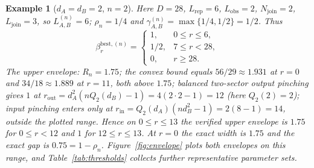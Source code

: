 \documentclass[11pt,a4paper]{article}
\newtheorem{example}[theorem]{Example}
\begin{document}
\begin{example}[$d_A=d_B=2$, $n=2$]
\label{ex:222}
Here $D=28$, $L_{\mathrm{rep}}=6$, $L_{\mathrm{obs}}=2$, $N_{\mathrm{join}}=2$, $L_{\mathrm{join}}=3$, so $L_{A,B}^{(n)}=6$; $\rho_n=1/4$ and $\gamma_{A,B}^{(n)}=\max\{1/4,1/2\}=1/2$. Thus
\[
\beta_r^{\mathrm{best},(n)}=
\begin{cases}
1,&0\le r\le6,\\
1/2,&7\le r<28,\\
0,&r\ge28.
\end{cases}
\]
The upper envelope: $R_n=1.75$; the convex bound equals $56/29\approx1.931$ at $r=0$ and $34/18\approx1.889$ at $r=11$, both above $1.75$; balanced two-sector output pinching gives $1$ at $r_{\mathrm{out}}=d_A^2(nQ_2(d_B)-1)=4(2\cdot2-1)=12$ (here $Q_2(2)=2$); input pinching enters only at $r_{\mathrm{in}}=Q_2(d_A)(nd_B^2-1)=2(8-1)=14$, outside the plotted range. Hence on $0\le r\le13$ the verified upper envelope is $1.75$ for $0\le r<12$ and $1$ for $12\le r\le13$. At $r=0$ the exact width is $1.75$ and the exact gap is $0.75=1-\rho_n$. Figure~\ref{fig:envelope} plots both envelopes on this range, and Table~\ref{tab:thresholds} collects further representative parameter sets.
\end{example}
\end{document}
